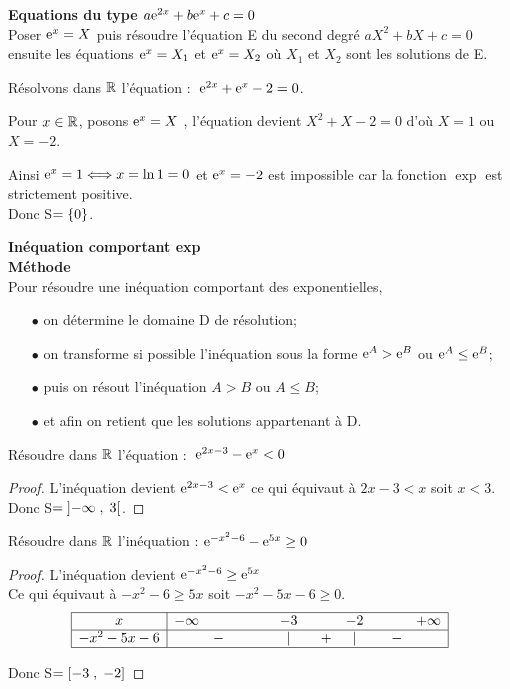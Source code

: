 \textbf{Equations du type $a\mathrm{e}^{2x} +b\mathrm{e}^{x}+c=0$ }\\
Poser $ \mathrm{e}^{x}=X $ puis résoudre l'équation E du second degré $ aX^{2}+bX+c=0 $ ensuite  les équations $ \mathrm{e}^{x}=X_{1} $  et $ \mathrm{e}^{x}=X_{2} $  où $ X_{1}$ et $X_{2} $  sont les solutions de E.
\begin{example} Résolvons dans $ \mathbb{R} $  l'équation  : $\; \mathrm{e}^{2x} +\mathrm{e}^{x}-2=0$. 

Pour $ x\in \mathbb{R} $, posons  $\mathrm{e}^{x} =X $ ,\; l'équation  \; devient $ X^{2} +X-2=0$ d'où $X=1 $ ou $X=-2 $.

Ainsi  $ \mathrm{e}^{x}=1 \Longleftrightarrow x=\ln 1=0$  et $ \mathrm{e}^{x}=-2 $ est  impossible car la fonction $ \exp $ est strictement positive.\\ Donc S$ =\left\{0\right\} $.
\end{example}
\textbf{Inéquation comportant exp}\\
\textbf{Méthode}\\
Pour résoudre une inéquation comportant des exponentielles,
\begin{itemize}
\item[$ \bullet$] on détermine le domaine D de résolution;
\item[$ \bullet$] on transforme si possible l'inéquation sous la forme $ \mathrm{e}^{A}> \mathrm{e}^{ B }$ ou $ \mathrm{e}^{A} \leq\mathrm{e}^{ B}$;
\item[$ \bullet$] puis on  résout l'inéquation $ A> B $  ou $ A\leq B $;
\item[$ \bullet$]  et afin on retient que les solutions appartenant à D.
\end{itemize}



\begin{example} Résoudre dans $ \mathbb{R} $ l'équation : $\; \mathrm{e}^{2x-3}-\mathrm{e}^{ x}< 0 $
\end{example}
\begin{proof}
L'inéquation devient  $ \mathrm{e}^{2x-3}<\mathrm{e}^{x}$  ce qui équivaut à $ 2x-3<x $  soit $ x<3 $.\\ Donc S$ = \left]-\infty \;,\; 3\right[ $.
\end{proof}


\begin{example} Résoudre dans $ \mathbb{R} $ l'inéquation :\; $ \mathrm{e}^{-x^{2}-6}-\mathrm{e}^{ 5x}\geq 0  $
\end{example}
\begin{proof}

L'inéquation devient  $\mathrm{e}^{-x^{2}-6}\geq \mathrm{e}^{ 5x}$ \\

Ce qui équivaut à $ -x^{2}-6\geq 5x$ \;  soit \; $ -x^{2}-5x-6\geq 0 $. 
\[
\begin{array}{|c|ccccccc|}
\hline
x & -\infty & & -3 & & -2 & & +\infty\\ 
\hline
-x^{2}-5x-6 & & -~~~\qquad &\vert& ~~+ &\vert& \quad - & \\
\hline
\end{array}
\]

  
 Donc S$ =\left[-3\;,\; -2\right]$
\end{proof}

